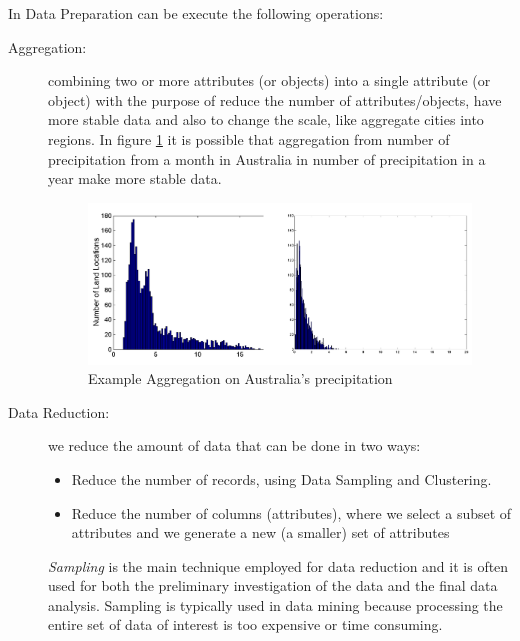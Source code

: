 In Data Preparation can be execute the following operations:
\begin{description}
    \item [Aggregation: ] combining two or more attributes (or objects) into a single attribute (or object)
                          with the purpose of reduce the number of attributes/objects, have more stable
                          data and also to change the scale, like aggregate cities into regions.\newline
                          In figure \ref{img:stableData} it is possible that aggregation from number of precipitation
                          from a month in Australia in number of precipitation in a year make more stable data.
                          \begin{figure}
				  \caption{Example Aggregation on Australia's precipitation}
                              \label{img:stableData}
			      \includegraphics[width=\textwidth]{Images/stableData}
                          \end{figure}
    \item [Data Reduction: ] we reduce the amount of data that can be done in two ways:
                             \begin{itemize}
                                \item Reduce the number of records, using Data Sampling and Clustering.
                                \item Reduce the number of columns (attributes), where we select a subset
                                      of attributes and we generate a new (a smaller) set of attributes
                             \end{itemize}
                             \emph{Sampling} is the main technique employed for data reduction and it
                             is often used for both the preliminary investigation of the data 
                             and the final data analysis.\newline
                             Sampling is typically used in data mining because processing the entire set of data
                             of interest is too expensive or time consuming.


\end{description}
